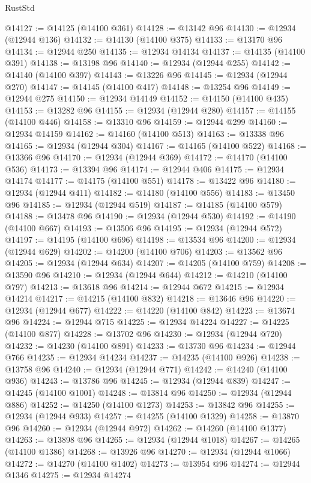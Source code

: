 \begin{lexlean}{RustStd}
\begin{coremodule}
@14127 := @14125 (@14100 @361)
@14128 := @13142 @96
@14130 := @12934 (@12944 @136)
@14132 := @14130 (@14100 @375)
@14133 := @13170 @96
@14134 := @12944 @250
@14135 := @12934 @14134
@14137 := @14135 (@14100 @391)
@14138 := @13198 @96
@14140 := @12934 (@12944 @255)
@14142 := @14140 (@14100 @397)
@14143 := @13226 @96
@14145 := @12934 (@12944 @270)
@14147 := @14145 (@14100 @417)
@14148 := @13254 @96
@14149 := @12944 @275
@14150 := @12934 @14149
@14152 := @14150 (@14100 @435)
@14153 := @13282 @96
@14155 := @12934 (@12944 @280)
@14157 := @14155 (@14100 @446)
@14158 := @13310 @96
@14159 := @12944 @299
@14160 := @12934 @14159
@14162 := @14160 (@14100 @513)
@14163 := @13338 @96
@14165 := @12934 (@12944 @304)
@14167 := @14165 (@14100 @522)
@14168 := @13366 @96
@14170 := @12934 (@12944 @369)
@14172 := @14170 (@14100 @536)
@14173 := @13394 @96
@14174 := @12944 @406
@14175 := @12934 @14174
@14177 := @14175 (@14100 @551)
@14178 := @13422 @96
@14180 := @12934 (@12944 @411)
@14182 := @14180 (@14100 @556)
@14183 := @13450 @96
@14185 := @12934 (@12944 @519)
@14187 := @14185 (@14100 @579)
@14188 := @13478 @96
@14190 := @12934 (@12944 @530)
@14192 := @14190 (@14100 @667)
@14193 := @13506 @96
@14195 := @12934 (@12944 @572)
@14197 := @14195 (@14100 @696)
@14198 := @13534 @96
@14200 := @12934 (@12944 @629)
@14202 := @14200 (@14100 @706)
@14203 := @13562 @96
@14205 := @12934 (@12944 @634)
@14207 := @14205 (@14100 @759)
@14208 := @13590 @96
@14210 := @12934 (@12944 @644)
@14212 := @14210 (@14100 @797)
@14213 := @13618 @96
@14214 := @12944 @672
@14215 := @12934 @14214
@14217 := @14215 (@14100 @832)
@14218 := @13646 @96
@14220 := @12934 (@12944 @677)
@14222 := @14220 (@14100 @842)
@14223 := @13674 @96
@14224 := @12944 @715
@14225 := @12934 @14224
@14227 := @14225 (@14100 @877)
@14228 := @13702 @96
@14230 := @12934 (@12944 @720)
@14232 := @14230 (@14100 @891)
@14233 := @13730 @96
@14234 := @12944 @766
@14235 := @12934 @14234
@14237 := @14235 (@14100 @926)
@14238 := @13758 @96
@14240 := @12934 (@12944 @771)
@14242 := @14240 (@14100 @936)
@14243 := @13786 @96
@14245 := @12934 (@12944 @839)
@14247 := @14245 (@14100 @1001)
@14248 := @13814 @96
@14250 := @12934 (@12944 @886)
@14252 := @14250 (@14100 @1273)
@14253 := @13842 @96
@14255 := @12934 (@12944 @933)
@14257 := @14255 (@14100 @1329)
@14258 := @13870 @96
@14260 := @12934 (@12944 @972)
@14262 := @14260 (@14100 @1377)
@14263 := @13898 @96
@14265 := @12934 (@12944 @1018)
@14267 := @14265 (@14100 @1386)
@14268 := @13926 @96
@14270 := @12934 (@12944 @1066)
@14272 := @14270 (@14100 @1402)
@14273 := @13954 @96
@14274 := @12944 @1346
@14275 := @12934 @14274

\end{coremodule}
\end{lexlean}
